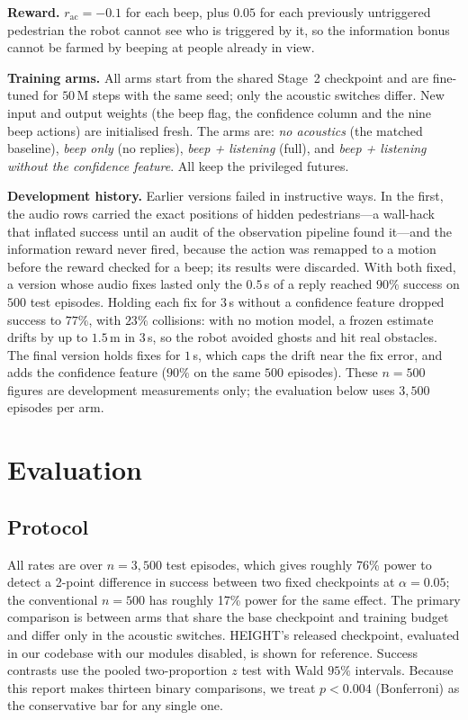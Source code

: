 \documentclass[conference]{IEEEtran}
\begin{document}
\textbf{Reward.} $r_{\text{ac}} = -0.1$ for each beep, plus $0.05$ for each previously
untriggered pedestrian the robot cannot see who is triggered by it, so the information bonus
cannot be farmed by beeping at people already in view.

\textbf{Training arms.} All arms start from the shared Stage~2 checkpoint and are fine-tuned
for $50$\,M steps with the same seed; only the acoustic switches differ. New input and output
weights (the beep flag, the confidence column and the nine beep actions) are initialised fresh.
The arms are: \emph{no acoustics} (the matched baseline), \emph{beep only} (no replies),
\emph{beep + listening} (full), and \emph{beep + listening without the confidence feature}. All
keep the privileged futures.

\textbf{Development history.} Earlier versions failed in instructive ways. In the first, the
audio rows carried the exact positions of hidden pedestrians---a wall-hack that inflated success
until an audit of the observation pipeline found it---and the information reward never fired,
because the action was remapped to a motion before the reward checked for a beep; its results
were discarded. With both fixed, a version whose audio fixes lasted only the $0.5$\,s of a reply
reached $90\%$ success on $500$ test episodes. Holding each fix for $3$\,s without a confidence
feature dropped success to $77\%$, with $23\%$ collisions: with no motion model, a frozen
estimate drifts by up to $1.5$\,m in $3$\,s, so the robot avoided ghosts and hit real obstacles.
The final version holds fixes for $1$\,s, which caps the drift near the fix error, and adds the
confidence feature ($90\%$ on the same $500$ episodes). These $n=500$ figures are development
measurements only; the evaluation below uses $3{,}500$ episodes per arm.

\section{Evaluation}
\label{sec:eval}

\subsection{Protocol}
All rates are over $n=3{,}500$ test episodes, which gives roughly 76\% power to detect a
2-point difference in success between two fixed checkpoints at $\alpha=0.05$; the
conventional $n=500$ has roughly 17\% power for the same effect. The primary comparison is
between arms that share the base checkpoint and training budget and differ only in the acoustic
switches. HEIGHT's released checkpoint, evaluated in our codebase with our modules disabled, is
shown for reference. Success contrasts use the pooled two-proportion $z$ test with Wald $95\%$
intervals. Because this report makes thirteen binary comparisons, we treat $p<0.004$
(Bonferroni) as the conservative bar for any single one.
\end{document}
